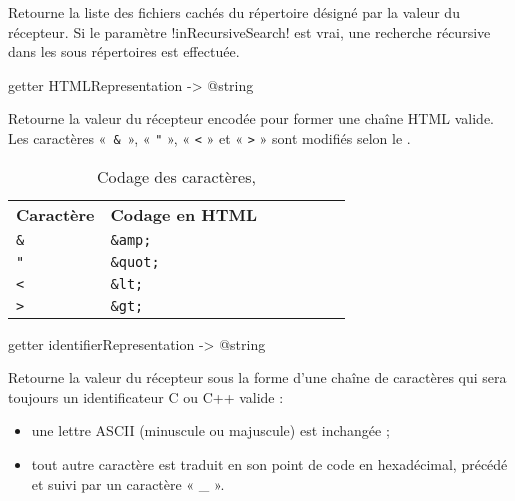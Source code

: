 Retourne la liste des fichiers cachés du répertoire désigné par la valeur du récepteur. Si le paramètre \ggs!inRecursiveSearch! est vrai, une recherche récursive dans les sous répertoires est effectuée.











\begin{galgasbox}
getter HTMLRepresentation -> @string
\end{galgasbox}
Retourne la valeur du récepteur encodée pour former une chaîne HTML valide. Les caractères «~\texttt{\&}~», « \texttt{"} », « \texttt{<} » et « \texttt{>} » sont modifiés selon le .


\begin{table}[t]
  \centering
  \begin{tabular}{lllllll}
  \textbf{Caractère} & \textbf{Codage en HTML} \\
  \texttt{\&} & \texttt{\&amp;} \\
  \texttt{"} & \texttt{\&quot;} \\
  \texttt{<} & \texttt{\&lt;} \\
  \texttt{>} & \texttt{\&gt;} \\
  \end{tabular}
  \caption{Codage des caractères, }
  \ligne
\end{table}







\begin{galgasbox}
getter identifierRepresentation -> @string
\end{galgasbox}

Retourne la valeur du récepteur sous la forme d'une chaîne de caractères qui sera toujours un identificateur C ou C++ valide :
\begin{itemize}
\item une lettre ASCII (minuscule ou majuscule) est inchangée ;
\item tout autre caractère est traduit en son point de code en hexadécimal, précédé et suivi par un caractère « \_ ».
\end{itemize}

